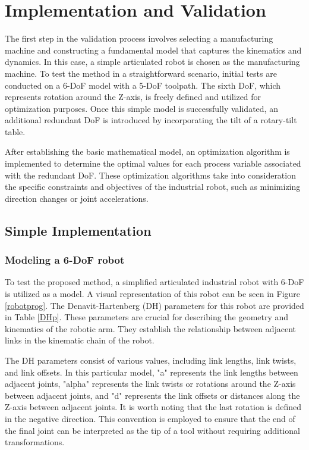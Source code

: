 \chapter{Implementation and Validation}%

The first step in the validation process involves selecting a manufacturing machine and constructing a fundamental model that captures the kinematics and dynamics. In this case, a simple articulated robot is chosen as the manufacturing machine. To test the method in a straightforward scenario, initial tests are conducted on a 6-\acrshort{DoF} model with a 5-\acrshort{DoF} toolpath. The sixth \acrshort{DoF}, which represents rotation around the Z-axis, is freely defined and utilized for optimization purposes. Once this simple model is successfully validated, an additional redundant \acrshort{DoF} is introduced by incorporating the tilt of a rotary-tilt table.

After establishing the basic mathematical model, an optimization algorithm is implemented to determine the optimal values for each process variable associated with the redundant \acrshort{DoF}. These optimization algorithms take into consideration the specific constraints and objectives of the industrial robot, such as minimizing direction changes or joint accelerations.



\section{Simple Implementation}%
\subsection{Modeling a 6-DoF robot}
To test the proposed method, a simplified articulated industrial robot with 6-\acrshort{DoF} is utilized as a model. A visual representation of this robot can be seen in Figure \ref{robotprog}. The Denavit-Hartenberg (\acrshort{DH}) parameters for this robot are provided in Table \ref{DHp}. These parameters are crucial for describing the geometry and kinematics of the robotic arm. They establish the relationship between adjacent links in the kinematic chain of the robot.

The \acrshort{DH} parameters consist of various values, including link lengths, link twists, and link offsets. In this particular model, "a" represents the link lengths between adjacent joints, "alpha" represents the link twists or rotations around the Z-axis between adjacent joints, and "d" represents the link offsets or distances along the Z-axis between adjacent joints. It is worth noting that the last rotation is defined in the negative direction. This convention is employed to ensure that the end of the final joint can be interpreted as the tip of a tool without requiring additional transformations.

